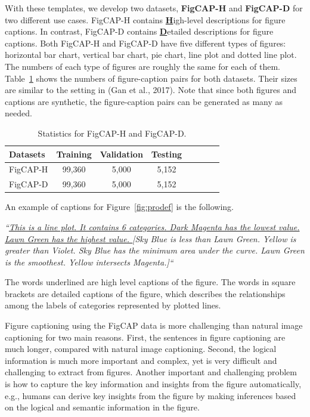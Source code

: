 \documentclass[11pt,a4paper]{article}
\begin{document}
With these templates, we develop two datasets, \textbf{FigCAP-H} and \textbf{FigCAP-D} for two different use cases. FigCAP-H contains \underline{\textbf{H}}igh-level descriptions for figure captions. In contrast, FigCAP-D contains \underline{\textbf{D}}etailed descriptions for figure captions. Both FigCAP-H and FigCAP-D have five different types of figures: horizontal bar chart, vertical bar chart, pie chart, line plot and dotted line plot. The numbers of each type of figures are roughly the same for each of them. Table~\ref{tab:statistics} shows the numbers of figure-caption pairs for both datasets. Their sizes are similar to the setting in (Gan et al., 2017). Note that since both figures and captions are synthetic, the figure-caption pairs can be generated as many as needed. 
\begin{table}[ht]
\renewcommand{\arraystretch}{1.1} %
\begin{center}
\begin{tabular}{lccccccc}
\toprule[1.2pt]
Datasets & Training & Validation & Testing \\
\midrule
FigCAP-H & 99,360 & 5,000 & 5,152 \\
FigCAP-D & 99,360 & 5,000 & 5,152 \\
\bottomrule[1.2pt]
\end{tabular}
\caption{Statistics for FigCAP-H and FigCAP-D.}
\label{tab:statistics}
\end{center}
\end{table}
An example of captions for Figure~\ref{fig:prodef} is the following. 

\textit{``\ul{This is a line plot. It contains 6 categories. Dark Magenta has the lowest value. Lawn Green has the highest value. 
}[Sky Blue is less than Lawn Green. Yellow is greater than Violet. Sky Blue has the minimum area under the curve. Lawn Green is the smoothest. Yellow intersects Magenta.]``}

The words underlined are high level captions of the figure. The words in square brackets are detailed captions of the figure, which describes the relationships among the labels of categories represented by plotted lines. 


Figure captioning using the FigCAP data is more challenging than natural image captioning for two main reasons.
First, the sentences in figure captioning are much longer, compared with natural image captioning.
Second, the logical information is much more important and complex, yet is very difficult and challenging to extract from figures.
Another important and challenging problem is how to capture the key information and insights from the figure automatically, e.g., humans can derive key insights from the figure by making inferences based on the logical and semantic information in the figure.
\end{document}

